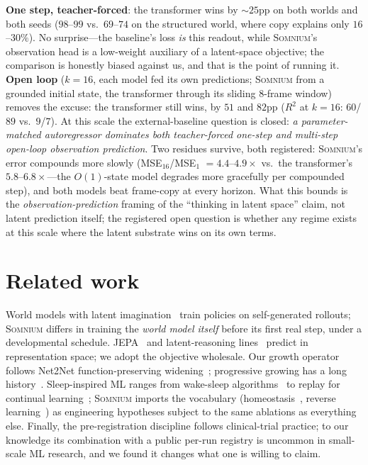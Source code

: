 \documentclass[11pt,a4paper]{article}
\newcommand{\som}{\textsc{Somnium}}
\begin{document}
\textbf{One step, teacher-forced}: the transformer wins by ${\sim}25$pp on both worlds and both seeds ($98$--$99$ vs.\ $69$--$74$ on the structured world, where copy explains only $16$--$30\%$). No surprise---the baseline's loss \emph{is} this readout, while \som{}'s observation head is a low-weight auxiliary of a latent-space objective; the comparison is honestly biased against us, and that is the point of running it. \textbf{Open loop} ($k{=}16$, each model fed its own predictions; \som{} from a grounded initial state, the transformer through its sliding 8-frame window) removes the excuse: the transformer still wins, by $51$ and $82$pp ($R^2$ at $k{=}16$: $60$/$89$ vs.\ $9$/$7$). At this scale the external-baseline question is closed: \emph{a parameter-matched autoregressor dominates both teacher-forced one-step and multi-step open-loop observation prediction}. Two residues survive, both registered: \som{}'s error compounds more slowly (MSE$_{16}$/MSE$_1$ $= 4.4$--$4.9\times$ vs.\ the transformer's $5.8$--$6.8\times$---the $O(1)$-state model degrades more gracefully per compounded step), and both models beat frame-copy at every horizon. What this bounds is the \emph{observation-prediction} framing of the ``thinking in latent space'' claim, not latent prediction itself; the registered open question is whether any regime exists at this scale where the latent substrate wins on its own terms.

\section{Related work}

World models with latent imagination~\cite{hafner2023} train policies on self-generated rollouts; \som{} differs in training the \emph{world model itself} before its first real step, under a developmental schedule. JEPA~\cite{lecun2022,assran2023} and latent-reasoning lines~\cite{hao2024,lcms} predict in representation space; we adopt the objective wholesale. Our growth operator follows Net2Net function-preserving widening~\cite{wei2016}; progressive growing has a long history~\cite{karras2018}. Sleep-inspired ML ranges from wake-sleep algorithms~\cite{hinton1995} to replay for continual learning~\cite{shin2017}; \som{} imports the vocabulary (homeostasis~\cite{tononi2014}, reverse learning~\cite{crick1983}) as engineering hypotheses subject to the same ablations as everything else. Finally, the pre-registration discipline follows clinical-trial practice; to our knowledge its combination with a public per-run registry is uncommon in small-scale ML research, and we found it changes what one is willing to claim.
\end{document}
